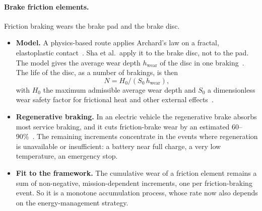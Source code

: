\documentclass[11pt,a4paper]{article}
\theoremstyle{plain}
\theoremstyle{definition}
\theoremstyle{remark}
\begin{document}
\paragraph{Brake friction elements.}
Friction braking wears the brake pad and the brake disc.
\begin{itemize}
  \item \textbf{Model.}
    A physics-based route applies Archard's law on a fractal, elastoplastic contact~\cite[Eqs.~11,~14]{Sha2022}.
    Sha et al.\ apply it to the brake disc, not to the pad.
    The model gives the average wear depth $h_{\mathrm{wear}}$ of the disc in one braking~\cite[Eq.~21]{Sha2022}.
    The life of the disc, as a number of brakings, is then
    \begin{equation}
      N = H_0/(S_0\,h_{\mathrm{wear}}),
    \end{equation}
    with $H_0$ the maximum admissible average wear depth and $S_0$ a dimensionless wear safety factor for frictional heat and other external effects~\cite[Eq.~22]{Sha2022}.
  \item \textbf{Regenerative braking.}
    In an electric vehicle the regenerative brake absorbs most service braking, and it cuts friction-brake wear by an estimated 60--90\%~\cite[Sec.~6.1]{Fussell2022}.
    The remaining increments concentrate in the events where regeneration is unavailable or insufficient: a battery near full charge, a very low temperature, an emergency stop.
  \item \textbf{Fit to the framework.}
    The cumulative wear of a friction element remains a sum of non-negative, mission-dependent increments, one per friction-braking event.
    So it is a monotone accumulation process, whose rate now also depends on the energy-management strategy.
\end{itemize}
\end{document}
